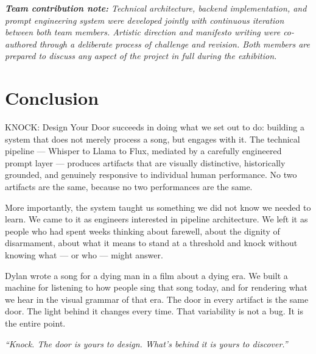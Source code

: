 \documentclass[12pt, a4paper]{article}
\begin{document}
\vspace{12pt}
\begin{mdframed}[linecolor=gold, linewidth=0.4pt, backgroundcolor=lightgray,
    innerleftmargin=10pt, innerrightmargin=10pt,
    innertopmargin=8pt, innerbottommargin=8pt]
\small\itshape\color{midgray}
\textbf{Team contribution note:} Technical architecture, backend implementation, and
prompt engineering system were developed jointly with continuous iteration between
both team members. Artistic direction and manifesto writing were co-authored through
a deliberate process of challenge and revision. Both members are prepared to discuss
any aspect of the project in full during the exhibition.
\end{mdframed}

\section{Conclusion}

KNOCK: Design Your Door succeeds in doing what we set out to do: building a system
that does not merely process a song, but engages with it. The technical pipeline ---
Whisper to Llama to Flux, mediated by a carefully engineered prompt layer ---
produces artifacts that are visually distinctive, historically grounded, and genuinely
responsive to individual human performance. No two artifacts are the same, because
no two performances are the same.

More importantly, the system taught us something we did not know we needed to learn.
We came to it as engineers interested in pipeline architecture. We left it as people
who had spent weeks thinking about farewell, about the dignity of disarmament, about
what it means to stand at a threshold and knock without knowing what --- or who ---
might answer.

Dylan wrote a song for a dying man in a film about a dying era. We built a machine
for listening to how people sing that song today, and for rendering what we hear in
the visual grammar of that era. The door in every artifact is the same door. The
light behind it changes every time. That variability is not a bug. It is the entire
point.

\begin{quotebox}
    \centering\itshape\color{rust}
    ``Knock. The door is yours to design. What's behind it is yours to discover.''
\end{quotebox}
\end{document}
